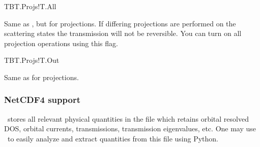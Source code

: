\begin{fdflogicalF}{TBT.Projs!T.All}%

  Same as , but for projections. If differing
  projections are performed on the scattering states the transmission
  will not be reversible. You can turn on all projection operations
  using this flag.

\end{fdflogicalF}

\begin{fdflogicalF}{TBT.Projs!T.Out}%

  Same as  for projections. 
  
\end{fdflogicalF}



\subsubsection{NetCDF4 support}

\tbtrans\ stores all relevant physical quantities in the
 file which retains orbital resolved DOS, orbital
currents, transmissions, transmission eigenvalues, etc. One may use
\sisl\ to easily analyze and extract quantities from this file using
Python. 

